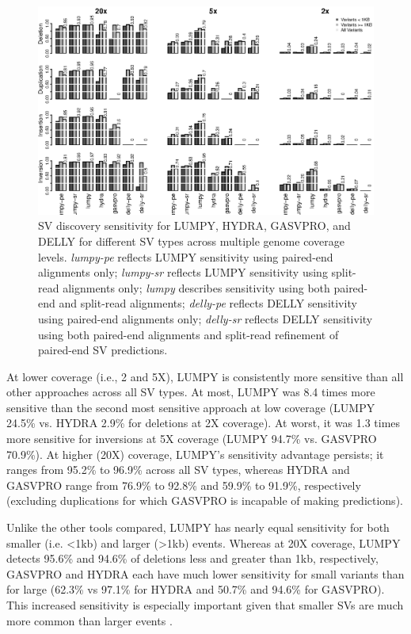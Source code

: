 \documentclass[11pt]{article}
\begin{document}
\begin{figure}
\includegraphics[width=6.5in]{R/ss_sl_s-un_hy_gv_dl-r10x.eps}
\caption{SV discovery sensitivity for LUMPY, HYDRA, GASVPRO, and DELLY for
different SV types across multiple genome coverage levels. \emph{lumpy-pe} 
reflects LUMPY sensitivity using paired-end alignments only; \emph{lumpy-sr} 
reflects LUMPY sensitivity using split-read alignments only; \emph{lumpy} 
describes sensitivity using both paired-end and split-read alignments; 
\emph{delly-pe} reflects DELLY sensitivity using paired-end alignments only; 
\emph{delly-sr} reflects DELLY sensitivity using both paired-end alignments 
and split-read refinement of paired-end SV predictions.}
\label{sensitivity:fig}
\end{figure}

At lower coverage (i.e., 2 and 5X), LUMPY is consistently more sensitive 
than all other approaches across all SV types. At most, LUMPY was 
8.4 times more sensitive than the second most sensitive approach at low 
coverage (LUMPY 24.5\% vs. HYDRA 2.9\% for deletions at 2X coverage). At worst, 
it was 1.3 times more sensitive for inversions at 5X coverage (LUMPY 94.7\% vs. 
GASVPRO 70.9\%). At higher (20X) coverage, 
LUMPY's sensitivity advantage persists; it ranges from 95.2\% to 96.9\% 
across all SV types, whereas HYDRA and GASVPRO range from 76.9\% to 92.8\% and
59.9\% to 91.9\%, respectively (excluding duplications for which GASVPRO is
incapable of making predictions).

Unlike the other tools compared, LUMPY has nearly equal sensitivity for 
both smaller (i.e. \textless 1kb) and larger (\textgreater 1kb) events. 
Whereas at 20X coverage,
LUMPY detects 95.6\% and 94.6\% of deletions less and greater than 1kb, 
respectively, GASVPRO and HYDRA each have much lower sensitivity for small
variants than for large (62.3\% vs 97.1\% for HYDRA and 50.7\% and 94.6\% for
GASVPRO). This increased sensitivity is especially important given that smaller
SVs are much more common than larger events \cite{mills2011}.
\end{document}
